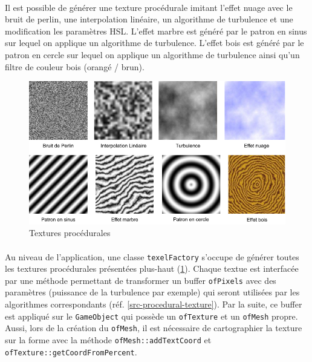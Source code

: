 \paragraph{} Il est possible de générer une texture procédurale imitant l'effet nuage avec le bruit de perlin, une interpolation linéaire, un algorithme de turbulence et une modification les paramètres HSL. L'effet marbre est généré par le patron en sinus sur lequel on applique un algorithme de turbulence. L'effet bois est généré par le patron en cercle sur lequel on applique un algorithme de turbulence ainsi qu'un filtre de couleur bois (orangé / brun).
\begin{figure}[H]
\centering
\includegraphics[width=\textwidth]{img/infog-image-procedural-texture.png}
\caption{Textures procédurales}\label{fig-procedural-texture}
\end{figure}
\paragraph{} Au niveau de l'application, une classe \texttt{texelFactory} s'occupe de générer toutes les textures procédurales présentées plus-haut (\ref{fig-procedural-texture}).  Chaque textue est interfacée par une méthode permettant de transformer un buffer \texttt{ofPixels} avec des paramètres (puissance de la turbulence par exemple) qui seront utilisées par les algorithmes correspondants (réf. \ref{src-procedural-texture}). Par la suite, ce buffer est appliqué sur le \texttt{GameObject} qui possède un \texttt{ofTexture} et un \texttt{ofMesh} propre. Aussi, lors de la création du \texttt{ofMesh}, il est nécessaire de cartographier la texture sur la forme avec la méthode \texttt{ofMesh::addTextCoord} et \texttt{ofTexture::getCoordFromPercent}.

